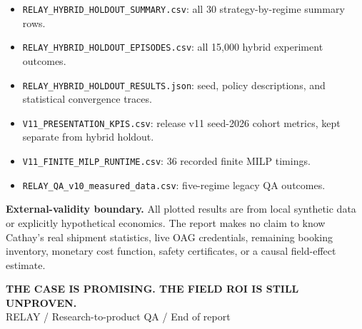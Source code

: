 \documentclass[10pt,a4paper]{article}
\newcommand{\subsect}[1]{\vspace{3mm}{\large\sffamily\bfseries #1}\par\vspace{1mm}}
\begin{document}
\subsect{Source artefacts (local experiment outputs)}
\begin{itemize}
\item \texttt{RELAY\_HYBRID\_HOLDOUT\_SUMMARY.csv}: all 30 strategy-by-regime summary rows.
\item \texttt{RELAY\_HYBRID\_HOLDOUT\_EPISODES.csv}: all 15,000 hybrid experiment outcomes.
\item \texttt{RELAY\_HYBRID\_HOLDOUT\_RESULTS.json}: seed, policy descriptions, and statistical convergence traces.
\item \texttt{V11\_PRESENTATION\_KPIS.csv}: release v11 seed-2026 cohort metrics, kept separate from hybrid holdout.
\item \texttt{V11\_FINITE\_MILP\_RUNTIME.csv}: 36 recorded finite MILP timings.
\item \texttt{RELAY\_QA\_v10\_measured\_data.csv}: five-regime legacy QA outcomes.
\end{itemize}
\begin{caution}
\textbf{External-validity boundary.} All plotted results are from local synthetic data or explicitly hypothetical economics. The report makes no claim to know Cathay's real shipment statistics, live OAG credentials, remaining booking inventory, monetary cost function, safety certificates, or a causal field-effect estimate.
\end{caution}
\vfill
\begin{center}
{\sffamily\Large\bfseries THE CASE IS PROMISING. THE FIELD ROI IS STILL UNPROVEN.}\\[4mm]
{\small\color{muted} RELAY / Research-to-product QA / End of report}
\end{center}
\end{document}
